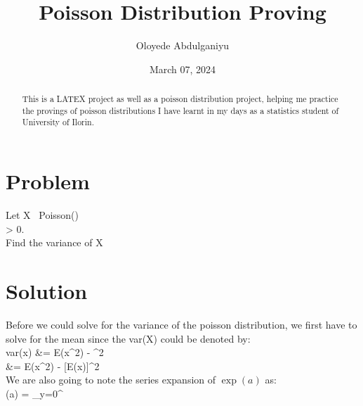 \documentclass[a4paper]{article}
\title{Poisson Distribution Proving}
\author{Oloyede Abdulganiyu}
\date{March 07, 2024}
\begin{document}
\maketitle

\begin{abstract}
This is a LATEX project as well as a poisson distribution project, helping me practice the provings of poisson distributions I have learnt in my days as a statistics student of University of Ilorin.
\end{abstract}

\section{Problem}
\begin{center}
Let X~ Poisson(\lambda)\\
 \lambda > 0.\\
Find the variance of X
\end{center}

\section{Solution}
\begin{center}
Before we could solve for the variance of the poisson distribution, we first have to solve for the mean since the var(X) could be denoted by:\\
var(x) &= E(x^2) - \mu^2 \\
&= E(x^2) - [E(x)]^2\\
We are also going to note the series expansion of $\exp(a)$  as:\\
\exp(a) = \sum_{y=0}^{\infty}
\end{center}
\end{document}
